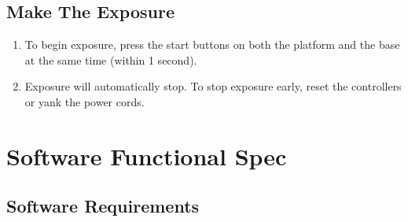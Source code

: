 \documentclass[dvips,12pt]{article}
\begin{document}
\subsection{Make The Exposure}
\begin{enumerate}
\item To begin exposure, press the start buttons on both the platform and the base at the same time (within 1 second).
\item Exposure will automatically stop. To stop exposure early, reset the
controllers or yank the power cords. 
\end{enumerate}

\section{Software Functional Spec}

\subsection{Software Requirements}
\end{document}
